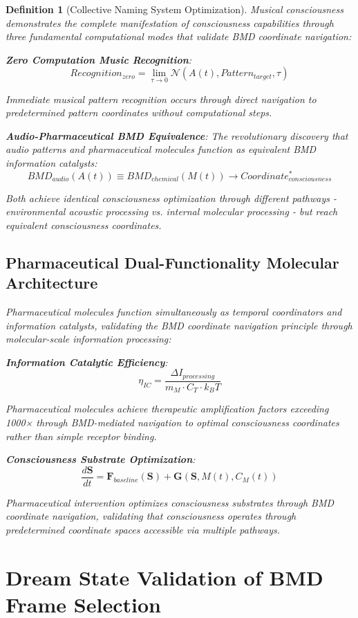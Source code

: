 \documentclass[12pt]{article}
\newtheorem{definition}{Definition}
\begin{document}
\begin{definition}[Collective Naming System Optimization]
Musical consciousness demonstrates the complete manifestation of consciousness capabilities through three fundamental computational modes that validate BMD coordinate navigation:

\textbf{Zero Computation Music Recognition}:
$$Recognition_{zero} = \lim_{\tau \to 0} \mathcal{N}(A(t), Pattern_{target}, \tau)$$

Immediate musical pattern recognition occurs through direct navigation to predetermined pattern coordinates without computational steps.

\textbf{Audio-Pharmaceutical BMD Equivalence}:
The revolutionary discovery that audio patterns and pharmaceutical molecules function as equivalent BMD information catalysts:
$$BMD_{audio}(A(t)) \equiv BMD_{chemical}(M(t)) \rightarrow Coordinate_{consciousness}^*$$

Both achieve identical consciousness optimization through different pathways - environmental acoustic processing vs. internal molecular processing - but reach equivalent consciousness coordinates.

\subsection{Pharmaceutical Dual-Functionality Molecular Architecture}

Pharmaceutical molecules function simultaneously as temporal coordinators and information catalysts, validating the BMD coordinate navigation principle through molecular-scale information processing:

\textbf{Information Catalytic Efficiency}:
$$\eta_{IC} = \frac{\Delta I_{processing}}{m_M \cdot C_T \cdot k_B T}$$

Pharmaceutical molecules achieve therapeutic amplification factors exceeding 1000× through BMD-mediated navigation to optimal consciousness coordinates rather than simple receptor binding.

\textbf{Consciousness Substrate Optimization}:
$$\frac{d\mathbf{S}}{dt} = \mathbf{F}_{baseline}(\mathbf{S}) + \mathbf{G}(\mathbf{S}, M(t), C_M(t))$$

Pharmaceutical intervention optimizes consciousness substrates through BMD coordinate navigation, validating that consciousness operates through predetermined coordinate spaces accessible via multiple pathways.

\section{Dream State Validation of BMD Frame Selection}


\end{definition}
\end{document}
